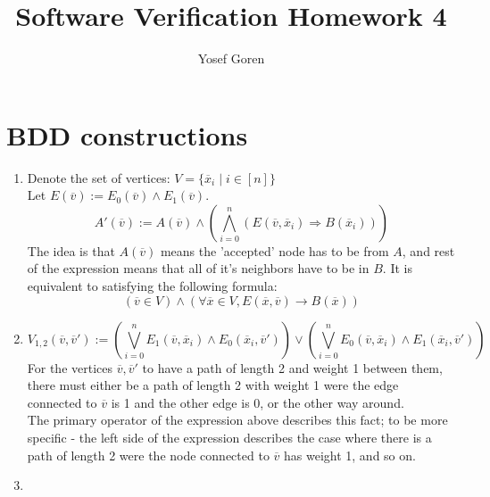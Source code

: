 \documentclass{article}
\newcommand{\lv}[0]{\overline{v}}
\newcommand{\lx}[0]{\overline{x}}
\begin{document}
\author{Yosef Goren}
\title{Software Verification Homework 4}
\maketitle

\section{BDD constructions}
\begin{enumerate}[label=\textbf{\alph*.}]
    \item 
        Denote the set of vertices: $V=\{\lx_i\mid i\in[n]\}$\\
        Let $E(\lv):=E_0(\lv)\wedge E_1(\lv)$.
        \[
            A'(\lv):=A(\lv)\wedge \left(\bigwedge_{i=0}^n(E(\lv,\lx_i)\Rightarrow B(\lx_i))\right)
        \]
        The idea is that $A(\lv)$ means the 'accepted' node has to be from $A$,
        and rest of the expression means that all of it's neighbors have to be in $B$.
        It is equivalent to satisfying the following formula:
        \[
            (\lv\in V)\wedge \left(\forall \lx\in V, E(\lx, \lv)\rightarrow B(\lx)\right)
        \]
    \item 
        \[
            V_{1,2}(\lv,\lv'):=
                \left(\bigvee_{i=0}^nE_1(\lv, \lx_i)\wedge E_0(\lx_i, \lv')\right)
                \vee
                \left(\bigvee_{i=0}^nE_0(\lv, \lx_i)\wedge E_1(\lx_i, \lv')\right)
        \]
        For the vertices $\lv,\lv'$ to have a 
        path of length 2 and weight 1 between them,
        there must either be a path of length 2 with weight
        1 were the edge connected to $\lv$ is 1 and the other edge is 0,
        or the other way around.\\
        The primary operator of the expression above describes this fact;
        to be more specific - the left side of the expression
        describes the case where there is a path of length 2 
        were the node connected to $\lv$ has weight 1, and so on.
    \item 
\end{enumerate}
    
\end{document}
